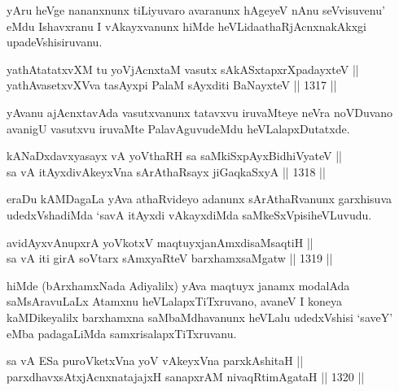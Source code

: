 \begin{artha}
yAru heVge  nananxnunx tiLiyuvaro avaranunx hAgeyeV nAnu seVvisuvenu' eMdu Ishavxranu I vAkayxvanunx hiMde heVLida\break athaRjAcnxnakAkxgi upadeVshisiruvanu.
\end{artha}

\begin{shl}
yathAtatatxvXM tu yoV\s jAcnxtaM vasutx sAkASxtapxrXpadayxteV ||  \\
yathAvasetxvXVva tasAyxpi PalaM  sAyxditi BaNayxteV \hfill || 1317 ||  
\end{shl}

\begin{artha}
yAvanu ajAcnxtavAda vasutxvanunx tatavxvu iruvaMteye neVra noVDuvano avanigU vasutxvu iruvaMte PalavAguvudeMdu heVLalapxDutatxde.
\end{artha}


\begin{shl}
kANaDxdavxyasayx vA yoV\s thaRH sa saMkiSxpAyxBidhiVyateV || \\
sa vA itAyxdivAkeyxVna sArAthaRsayx jiGaqkaSxyA \hfill || 1318 ||  
\end{shl}

\begin{artha}
eraDu kAMDagaLa yAva athaRvideyo adanunx sArAthaRvanunx garxhisuva udedxVshadiMda `savA itAyxdi vAkayxdiMda saMkeSxVpisi\break heVLuvudu.
\end{artha}


\begin{shl}
avidAyxvAnupxrA yoVkotxV maqtuyxjanAmxdisaMsaqtiH || \\
sa vA iti girA soV\s tarx sAmxyaRteV barxhamxsaMgatw \hfill || 1319 ||  
\end{shl}

\begin{artha}
hiMde (bArxhamxNada Adiyalilx) yAva maqtuyx janamx modalAda saMsAravuLaLx Atamxnu heVLalapxTiTxruvano, avaneV I koneya kaMDikeyalilx barxhamxna saMbaMdhavanunx heVLalu udedxVshisi `saveY' eMba padagaLiMda samxrisalapxTiTxruvanu.
\end{artha}


\begin{shl}
sa vA ESa puroVketxVna yoV vAkeyxVna parxkAshitaH || \\
parxdhavxsAtxjAcnxnatajajxH sanapxrAM nivaqRtimAgataH \hfill || 1320 ||  
\end{shl}

